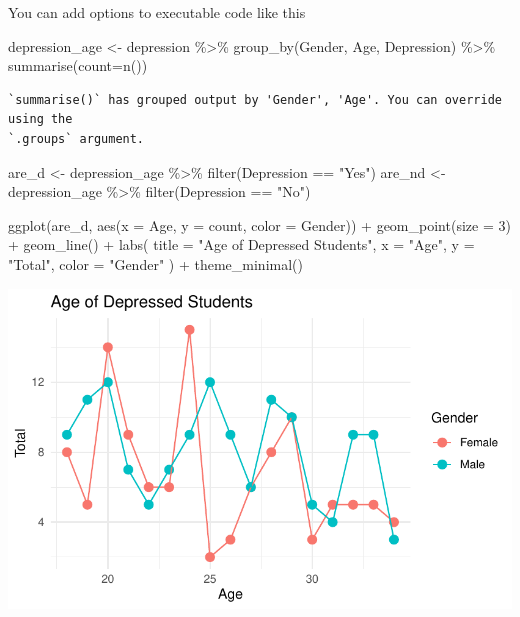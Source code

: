 \documentclass[
  letterpaper,
  DIV=11,
  numbers=noendperiod]{scrartcl}
\newenvironment{Shaded}{\begin{snugshade}}{\end{snugshade}}
\newcommand{\AttributeTok}[1]{\textcolor[rgb]{0.40,0.45,0.13}{#1}}
\newcommand{\DecValTok}[1]{\textcolor[rgb]{0.68,0.00,0.00}{#1}}
\newcommand{\FunctionTok}[1]{\textcolor[rgb]{0.28,0.35,0.67}{#1}}
\newcommand{\NormalTok}[1]{\textcolor[rgb]{0.00,0.23,0.31}{#1}}
\newcommand{\OtherTok}[1]{\textcolor[rgb]{0.00,0.23,0.31}{#1}}
\newcommand{\SpecialCharTok}[1]{\textcolor[rgb]{0.37,0.37,0.37}{#1}}
\newcommand{\StringTok}[1]{\textcolor[rgb]{0.13,0.47,0.30}{#1}}
\begin{document}
You can add options to executable code like this

\begin{Shaded}
\begin{Highlighting}[]
\NormalTok{depression\_age }\OtherTok{\textless{}{-}}\NormalTok{ depression }\SpecialCharTok{\%\textgreater{}\%} \FunctionTok{group\_by}\NormalTok{(Gender, Age, Depression) }\SpecialCharTok{\%\textgreater{}\%} \FunctionTok{summarise}\NormalTok{(}\AttributeTok{count=}\FunctionTok{n}\NormalTok{())}
\end{Highlighting}
\end{Shaded}

\begin{verbatim}
`summarise()` has grouped output by 'Gender', 'Age'. You can override using the
`.groups` argument.
\end{verbatim}

\begin{Shaded}
\begin{Highlighting}[]
\NormalTok{are\_d }\OtherTok{\textless{}{-}}\NormalTok{ depression\_age }\SpecialCharTok{\%\textgreater{}\%} \FunctionTok{filter}\NormalTok{(Depression }\SpecialCharTok{==} \StringTok{"Yes"}\NormalTok{)}
\NormalTok{are\_nd }\OtherTok{\textless{}{-}}\NormalTok{ depression\_age }\SpecialCharTok{\%\textgreater{}\%} \FunctionTok{filter}\NormalTok{(Depression }\SpecialCharTok{==} \StringTok{"No"}\NormalTok{)}

\FunctionTok{ggplot}\NormalTok{(are\_d, }\FunctionTok{aes}\NormalTok{(}\AttributeTok{x =}\NormalTok{ Age, }\AttributeTok{y =}\NormalTok{ count, }\AttributeTok{color =}\NormalTok{ Gender)) }\SpecialCharTok{+}
  \FunctionTok{geom\_point}\NormalTok{(}\AttributeTok{size =} \DecValTok{3}\NormalTok{) }\SpecialCharTok{+}    
  \FunctionTok{geom\_line}\NormalTok{() }\SpecialCharTok{+}       
  \FunctionTok{labs}\NormalTok{(}
    \AttributeTok{title =} \StringTok{"Age of Depressed Students"}\NormalTok{,}
    \AttributeTok{x =} \StringTok{"Age"}\NormalTok{,}
    \AttributeTok{y =} \StringTok{"Total"}\NormalTok{,}
    \AttributeTok{color =} \StringTok{"Gender"}
\NormalTok{  ) }\SpecialCharTok{+}
  \FunctionTok{theme\_minimal}\NormalTok{() }
\end{Highlighting}
\end{Shaded}

\includegraphics{Data_files/figure-pdf/unnamed-chunk-3-1.pdf}
\end{document}
